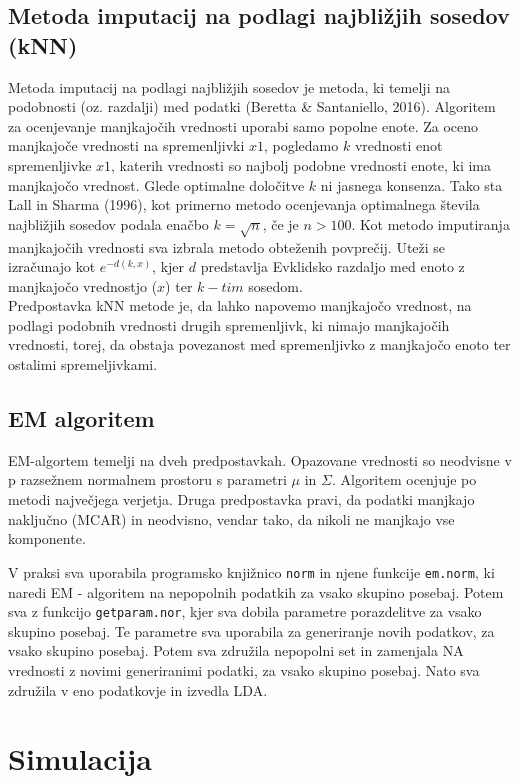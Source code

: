 \documentclass[12pt,a4paper]{article}
\begin{document}
\subsection{Metoda imputacij na podlagi najbližjih sosedov (kNN)}
Metoda imputacij na podlagi najbližjih sosedov je metoda, ki temelji na podobnosti (oz. razdalji) med podatki (Beretta \& Santaniello, 2016). Algoritem za ocenjevanje manjkajočih vrednosti uporabi samo popolne enote. Za oceno manjkajoče vrednosti na spremenljivki $x1$, pogledamo $k$ vrednosti enot spremenljivke $x1$, katerih vrednosti so najbolj podobne vrednosti enote, ki ima manjkajočo vrednost. Glede optimalne določitve $k$ ni jasnega konsenza. Tako sta Lall in Sharma (1996), kot primerno metodo ocenjevanja optimalnega števila najbližjih sosedov podala enačbo $k = \sqrt{n}$, če je $n > 100$. Kot metodo imputiranja manjkajočih vrednosti sva izbrala metodo obteženih povprečij. Uteži se izračunajo kot $e^{-d(k,x)}$, kjer $d$ predstavlja Evklidsko razdaljo med enoto z manjkajočo vrednostjo ($x$) ter $k-tim$ sosedom.\\
Predpostavka kNN metode je, da lahko napovemo manjkajočo vrednost, na podlagi podobnih vrednosti drugih spremenljivk, ki nimajo manjkajočih vrednosti, torej, da obstaja povezanost med spremenljivko z manjkajočo enoto ter ostalimi spremeljivkami.

\subsection{EM algoritem}

EM-algortem temelji na dveh predpostavkah. Opazovane vrednosti so neodvisne v p razsežnem normalnem prostoru s parametri $\mu$ in $\Sigma$. Algoritem ocenjuje po metodi največjega verjetja. Druga predpostavka pravi, da podatki manjkajo naključno (MCAR) in neodvisno, vendar tako, da nikoli ne manjkajo vse komponente.

V praksi sva uporabila programsko knjižnico \verb|norm| in njene funkcije \verb|em.norm|, ki naredi EM - algoritem na nepopolnih podatkih za vsako skupino posebaj. Potem sva z funkcijo \verb|getparam.nor|, kjer sva dobila parametre porazdelitve za vsako skupino posebaj. Te parametre sva uporabila za generiranje novih podatkov, za vsako skupino posebaj. Potem sva združila nepopolni set in zamenjala NA vrednosti z novimi generiranimi podatki, za vsako skupino posebaj. Nato sva združila v eno podatkovje in izvedla LDA.

\pagebreak

\section{Simulacija}
\end{document}
